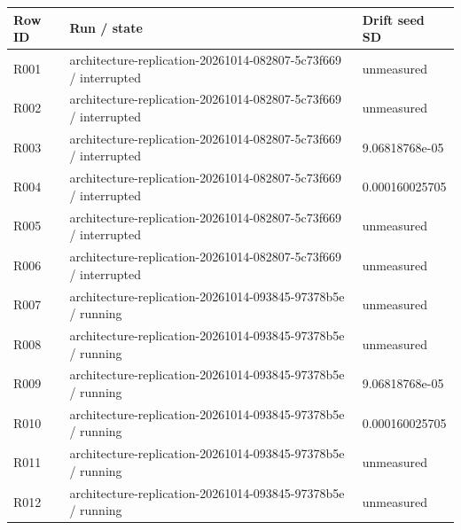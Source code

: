\documentclass[10pt]{article}
\begin{document}
{\scriptsize\setlength{\tabcolsep}{2pt}
\begin{longtable}{p{}p{}p{}}
Row ID & Run / state & Drift seed SD \\
\hline\endhead
R001 & architecture-replication-20261014-082807-5c73f669 / interrupted & unmeasured \\
R002 & architecture-replication-20261014-082807-5c73f669 / interrupted & unmeasured \\
R003 & architecture-replication-20261014-082807-5c73f669 / interrupted & 9.06818768e-05 \\
R004 & architecture-replication-20261014-082807-5c73f669 / interrupted & 0.000160025705 \\
R005 & architecture-replication-20261014-082807-5c73f669 / interrupted & unmeasured \\
R006 & architecture-replication-20261014-082807-5c73f669 / interrupted & unmeasured \\
R007 & architecture-replication-20261014-093845-97378b5e / running & unmeasured \\
R008 & architecture-replication-20261014-093845-97378b5e / running & unmeasured \\
R009 & architecture-replication-20261014-093845-97378b5e / running & 9.06818768e-05 \\
R010 & architecture-replication-20261014-093845-97378b5e / running & 0.000160025705 \\
R011 & architecture-replication-20261014-093845-97378b5e / running & unmeasured \\
R012 & architecture-replication-20261014-093845-97378b5e / running & unmeasured \\
\end{longtable}}
\end{document}
